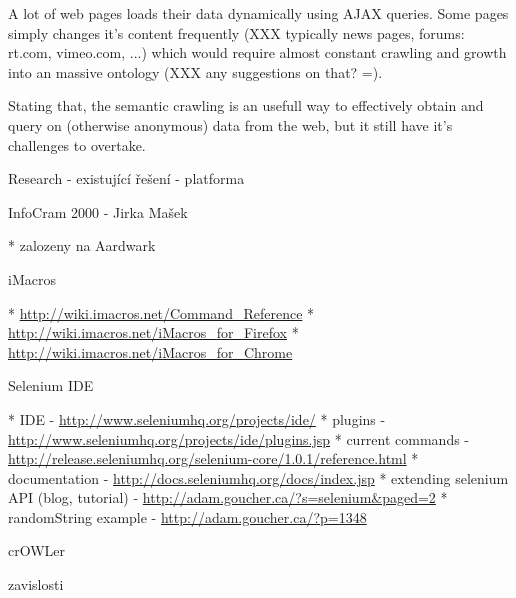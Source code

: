 A lot of web pages loads their data dynamically using AJAX queries. Some pages
simply changes it's content frequently (XXX typically news pages, forums: rt.com,
vimeo.com, ...) which would require almost constant crawling and growth into an
massive ontology (XXX any suggestions on that? =). 

Stating that, the semantic crawling is an usefull way to effectively obtain and
query on (otherwise anonymous) data from the web, but it still have it's challenges
to overtake. 




\sec Research - existující řešení - platforma


\secc InfoCram 2000 - Jirka Mašek

\begitems
  * zalozeny na Aardwark 
\enditems


\secc iMacros

\begitems
  * \url{http://wiki.imacros.net/Command_Reference}
  * \url{http://wiki.imacros.net/iMacros_for_Firefox}
  * \url{http://wiki.imacros.net/iMacros_for_Chrome}
\enditems



%



\secc Selenium IDE

\begitems
  * IDE - \url{http://www.seleniumhq.org/projects/ide/}
  * plugins - \url{http://www.seleniumhq.org/projects/ide/plugins.jsp}
  * current commands - \url{http://release.seleniumhq.org/selenium-core/1.0.1/reference.html}
  * documentation - \url{http://docs.seleniumhq.org/docs/index.jsp}
  * extending selenium API (blog, tutorial) - \url{http://adam.goucher.ca/?s=selenium&paged=2}
  \begitems
    * randomString example - \url{http://adam.goucher.ca/?p=1348}
  \enditems
\enditems






\sec crOWLer

\secc zavislosti

